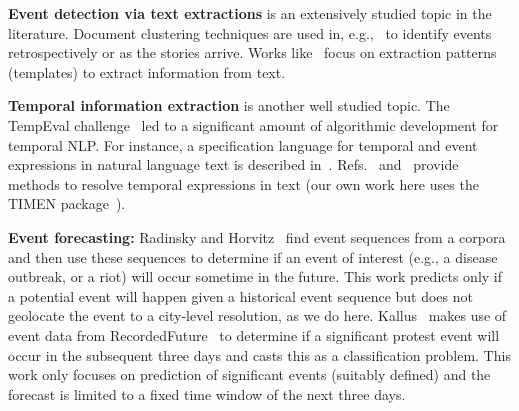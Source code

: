 \documentclass[letterpaper]{article}
\begin{document}
{\bf Event detection via text extractions}
is an extensively studied topic in the literature. Document clustering techniques are used 
in, e.g.,~\cite{Gabrilovich:2004:NPP} to identify events retrospectively or as the stories arrive.
Works like~\cite{Banko07openinformation,Chambers:2011:TIE,riloff2003learning} focus on
extraction patterns (templates) to extract information from text. 

{\bf Temporal information extraction} is another well studied topic.
The TempEval challenge~\cite{tempeval} led to a significant amount of
algorithmic development for temporal NLP.
For instance, a specification language
for temporal and event expressions in natural language text is described in~\cite{timeml}.
Refs.~\cite{LlorensDGS12} and~\cite{tempex} provide methods to resolve temporal expressions in text (our own
work here uses the TIMEN package~\cite{LlorensDGS12}).

{\bf Event forecasting:} 
Radinsky and Horvitz~\cite{Radinsky:2013:MWP} find event sequences from a corpora and then use these sequences to determine if 
an event of interest (e.g., a disease outbreak, or a riot)
will occur sometime in the future. This work predicts only if a potential event will happen given a historical event sequence
but does not geolocate the event to a city-level resolution, as we do here.
Kallus~\cite{nathankallus} makes use of event data from 
RecordedFuture~\cite{recordedFuture} to determine if a  significant protest event will occur in 
the subsequent three days and casts this as a classification problem.
This work only focuses on prediction of significant events (suitably defined) and
the forecast is limited to a fixed time window
of the next three days. 
\end{document}
